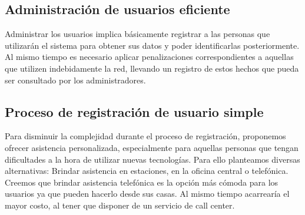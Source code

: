 \subsection{Administración de usuarios eficiente}

Administrar los usuarios implica básicamente registrar a las personas que utilizarán el sistema para obtener sus datos y 
poder identificarlas posteriormente. Al mismo tiempo es necesario aplicar penalizaciones correspondientes a aquellas que 
utilizen indebidamente la red, llevando un registro de estos hechos que pueda ser consultado por los administradores. 

\subsection{Proceso de registración de usuario simple}

Para disminuir la complejidad durante el proceso de registración, proponemos ofrecer asistencia personalizada, especialmente
para aquellas personas que tengan dificultades a la hora de utilizar nuevas tecnologías. Para ello planteamos diversas
alternativas: Brindar asistencia en estaciones, en la oficina central o telefónica.
Creemos que brindar asistencia telefónica es la opción más cómoda para los usuarios ya que pueden hacerlo desde sus casas.
Al mismo tiempo acarrearía el mayor costo, al tener que disponer de un servicio de call center.

\subsection{}






